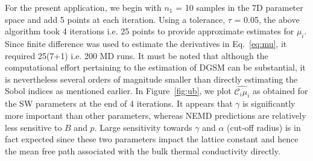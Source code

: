 %

For the present application, we begin with $n_1$ = 10 samples in the 7D parameter space and add 5 points
at each iteration. Using a tolerance, $\tau$ = 0.05, the above algorithm took 4 iterations i.e. 25 points to 
provide approximate estimates for $\mu_i$. Since finite difference was used to estimate the derivatives in
Eq.~\ref{eq:mu}, it required 25(7+1) i.e. 200 MD runs. It must be noted that although the computational effort
pertaining to the estimation of DGSM can be substantial, it is nevertheless several orders of magnitude smaller
than directly estimating the Sobol indices as mentioned earlier. 
In Figure~\ref{fig:ub}, we plot $\hat{\mathcal{C}_i\mu_i}$ as obtained for the SW parameters at the 
end of 4 iterations. It appears that $\gamma$ is significantly more important than other parameters, whereas NEMD
predictions are relatively less sensitive to $B$ and $p$. Large sensitivity towards 
$\gamma$ and $\alpha$ (cut-off radius) is in fact expected since  these two parameters impact the lattice
constant and hence the mean free path associated with the bulk thermal conductivity directly. 

